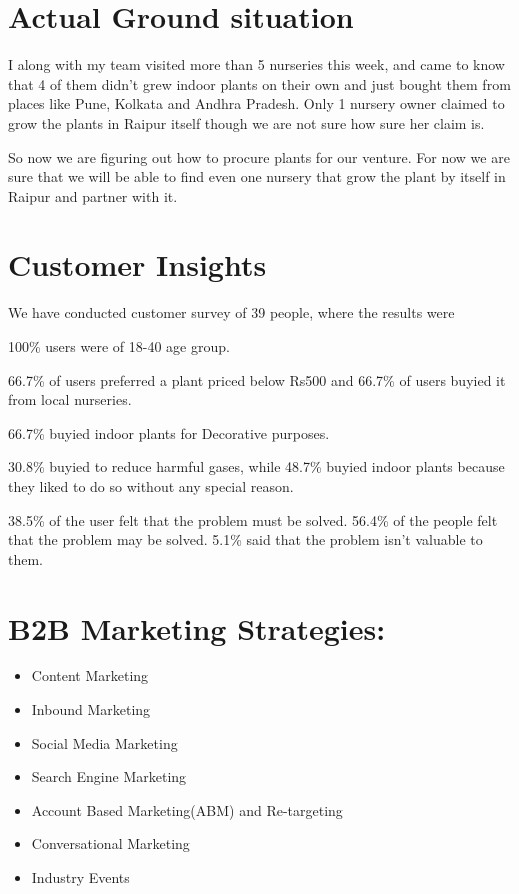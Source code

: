 \documentclass{article}
\begin{document}
\section{Actual Ground situation}

\large I along with my team visited more than 5 nurseries this week, and came to know that 4 of them didn’t grew indoor plants on their own and just bought them from places like Pune, Kolkata and Andhra Pradesh. Only 1 nursery owner claimed to grow the plants in Raipur itself though we are not sure how sure her claim is.

So now we are figuring out how to procure plants for our venture. For now we are sure that we will be able to find even one nursery that grow the plant by itself in Raipur and partner with it.

\section{Customer Insights}

\large We have conducted customer survey of 39 people, where the results were

   100\% users were of 18-40 age group. 
   
   66.7\% of users preferred a plant priced below Rs500 and 66.7\% of users buyied it from local nurseries.
   
   66.7\% buyied indoor plants for Decorative purposes. 
   
   30.8\% buyied to reduce harmful gases, while 48.7\% buyied indoor plants because they liked to do so without any special reason.
   
   38.5\% of the user felt that the problem must be solved. 56.4\% of the people felt that the problem may be solved. 5.1\% said that the problem isn’t valuable to them.
   


\section{B2B Marketing Strategies:}
\begin{itemize}
    \item Content Marketing
    \item Inbound Marketing
    \item Social Media Marketing
    \item Search Engine Marketing
    \item Account Based Marketing(ABM) and Re-targeting
    \item Conversational Marketing
    \item Industry Events
\end{itemize}
\end{document}
